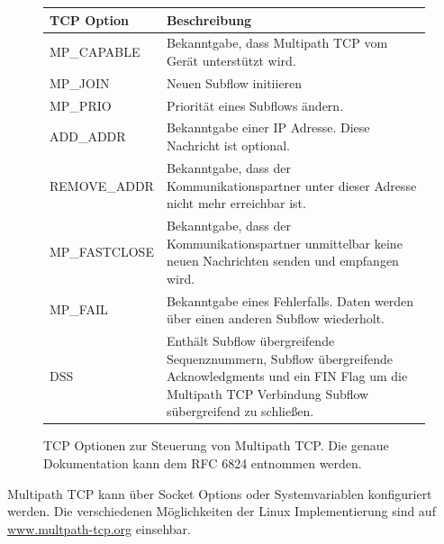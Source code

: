 \documentclass[a4paper, 12pt]{article}
\begin{document}
\begin{figure}[H]
\begin{center}
    \begin{tabular}{ | l | p{5cm} |}
    \hline
    \textbf{TCP Option} & \textbf{Beschreibung}  \\ \hline
    MP\_CAPABLE & Bekanntgabe, dass Multipath TCP vom Gerät unterstützt wird.  \\ \hline
    MP\_JOIN & Neuen Subflow initiieren \\ \hline
    MP\_PRIO &  Priorität eines Subflows ändern. \\ \hline
    ADD\_ADDR & Bekanntgabe einer IP Adresse. Diese Nachricht ist optional.\\ \hline
    REMOVE\_ADDR & Bekanntgabe, dass der Kommunikationspartner unter dieser Adresse nicht mehr erreichbar ist.\\ \hline
    MP\_FASTCLOSE & Bekanntgabe, dass der Kommunikationspartner unmittelbar keine neuen Nachrichten senden und empfangen wird.\\ \hline
     MP\_FAIL & Bekanntgabe eines Fehlerfalls. Daten werden über einen anderen Subflow wiederholt. \\ \hline
     DSS & Enthält Subflow übergreifende Sequenznummern, Subflow übergreifende Acknowledgments und ein FIN Flag um die Multipath TCP Verbindung Subflow sübergreifend zu schließen. \\ \hline
    \hline
    \end{tabular}
\end{center}    
\caption{TCP Optionen zur Steuerung von Multipath TCP. Die genaue Dokumentation kann dem RFC 6824 entnommen werden.}
\label{fig:mptcpOptions}
\end{figure}

Multipath TCP kann über Socket Options oder Systemvariablen konfiguriert werden.
Die verschiedenen Möglichkeiten der Linux Implementierung sind auf \url{www.multpath-tcp.org} einsehbar.
\end{document}

